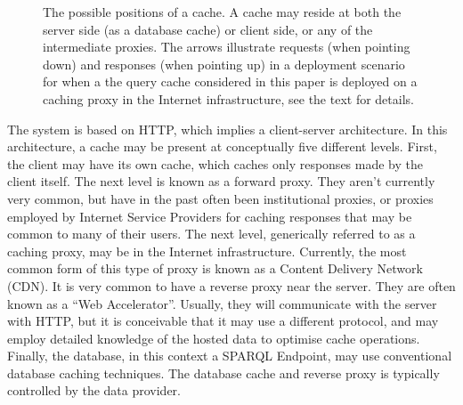 \documentclass[a4paper, 12pt]{article}
\newcommand*\circled[1]{\tikz[baseline=(char.base)]{
            \node[shape=circle,draw,inner sep=2pt] (char) {#1};}}
\begin{document}
\begin{figure}
\begin{center}
\caption{The possible positions of a cache. A cache may reside at both
  the server side (as a database cache) or client side, or any of the
  intermediate proxies. The arrows illustrate requests (when pointing
  down) and responses (when pointing up) in a deployment scenario for
  when a the query cache considered in this paper is deployed on a
  caching proxy in the Internet infrastructure, see the text for
  details.}\label{fig:messaging}
\end{center}
\end{figure}

The system is based on HTTP, which implies a client-server
architecture. In this architecture, a cache may be present at
conceptually five different levels. First, the client may have its own
cache, which caches only responses made by the client itself. The next
level is known as a forward proxy. They aren't currently very common,
but have in the past often been institutional proxies, or proxies
employed by Internet Service Providers for caching responses that may
be common to many of their users. The next level, generically referred
to as a caching proxy, may be in the Internet
infrastructure. Currently, the most common form of this type of proxy
is known as a Content Delivery Network (CDN). It is very common to
have a reverse proxy near the server. They are often known as a ``Web
Accelerator''. Usually, they will communicate with the server with
HTTP, but it is conceivable that it may use a different protocol, and
may employ detailed knowledge of the hosted data to optimise cache
operations. Finally, the database, in this context a SPARQL Endpoint,
may use conventional database caching techniques. The database cache
and reverse proxy is typically controlled by the data provider.
\end{document}
